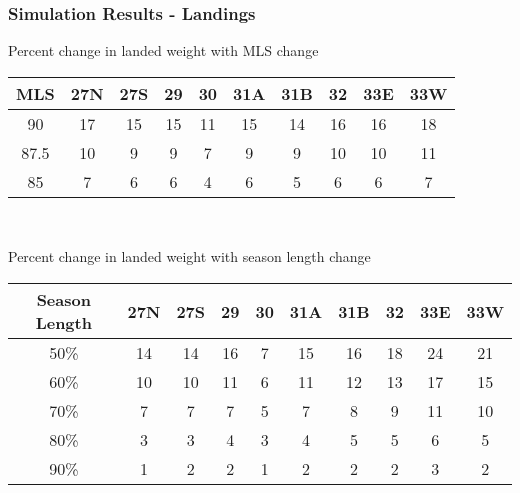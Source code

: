 \documentclass{beamer}
\begin{document}
\begin{frame}
\frametitle{Simulation Results - Landings}
Percent change in  landed weight  with MLS change 
\centering
\begin{tabular}{|c|c|c|c|c|c|c|c|c|c|}
\hline
MLS & 27N & 27S & 29 & 30 & 31A & 31B & 32 & 33E & 33W \\
\hline
90 & 17 & 15 & 15 & 11 & 15 & 14 & 16 & 16 & 18 \\
\hline
87.5 & 10 & 9  & 9  & 7  & 9  & 9  & 10 & 10 & 11 \\
\hline
85 & 7  & 6  & 6  & 4  & 6  & 5  & 6  & 6 & 7 \\
\hline
 
\end{tabular}\\
\vspace{5mm}

Percent change in  landed weight with season length change 
\centering
\begin{tabular}{|c|c|c|c|c|c|c|c|c|c|}
\hline
Season Length & 27N & 27S & 29 & 30 & 31A & 31B & 32 & 33E & 33W \\
\hline
50\% & 14 & 14 & 16 & 7 & 15 & 16 & 18 & 24 & 21 \\
\hline
60\% & 10 & 10 & 11 & 6 & 11 & 12 & 13 & 17 & 15 \\
\hline
70\% & 7  & 7  & 7  & 5 & 7  & 8  & 9  & 11 & 10 \\
\hline
80\% & 3  & 3  & 4  & 3 & 4  & 5  & 5  & 6  & 5  \\
\hline
90\% & 1  & 2  & 2  & 1 & 2  & 2  & 2  & 3  & 2  \\
\hline
 
\end{tabular}
\end{frame}
 
\end{document}
